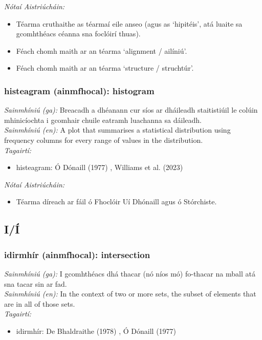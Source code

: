 \documentclass{article}
\begin{document}
 \noindent \textit{Nótaí Aistriúcháin:}
\begin{itemize}
	\item Téarma cruthaithe as téarmaí eile anseo (agus as `hipitéis', atá luaite sa gcomhthéacs céanna sna foclóirí thuas).
	\item Féach chomh maith ar an téarma `alignment / ailíniú'.
	\item Féach chomh maith ar an téarma `structure / struchtúr'.
\end{itemize}


\subsubsection*{histeagram (ainmfhocal): histogram}
 \noindent \textit{Sainmhíniú (ga):} Breacadh a dhéanann cur síos ar dháileadh staitistiúil le colúin mhinicíochta i gcomhair chuile eatramh luachanna sa dáileadh.
\\
 \noindent \textit{Sainmhíniú (en):} A plot that summarises a statistical distribution using frequency columns for every range of values in the distribution.
\\
 \noindent \textit{Tagairtí:}
\begin{itemize}
	\item histeagram: Ó Dónaill (1977) \cite{odonaill}, Williams et al. (2023) \cite{storchiste}
\end{itemize}

 \noindent \textit{Nótaí Aistriúcháin:}
\begin{itemize}
	\item Téarma díreach ar fáil ó Fhoclóir Uí Dhónaill agus ó Stórchiste.
\end{itemize}


\subsection*{I/Í}

\subsubsection*{idirmhír (ainmfhocal): intersection}
 \noindent \textit{Sainmhíniú (ga):} I gcomhthéacs dhá thacar (nó níos mó) fo-thacar na mball atá sna tacar sin ar fad.
\\
 \noindent \textit{Sainmhíniú (en):} In the context of two or more sets, the subset of elements that are in all of those sets.
\\
 \noindent \textit{Tagairtí:}
\begin{itemize}
	\item idirmhír: De Bhaldraithe (1978) \cite{de-bhaldraithe}, Ó Dónaill (1977) \cite{odonaill}
\end{itemize}
\end{document}
